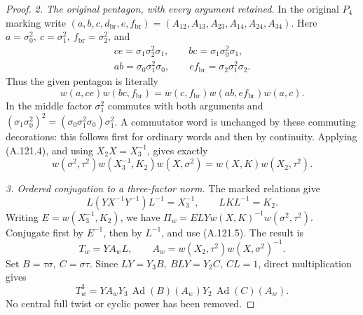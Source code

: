 \begin{proof}
\emph{2. The original pentagon, with every argument retained.}
In the original \(P_4\) marking write
\((a,b,c,d_{\mathrm{br}},e,f_{\mathrm{br}})
=(A_{12},A_{13},A_{23},A_{14},A_{24},A_{34})\).
Here \(a=\sigma_0^2,\ c=\sigma_1^2,\ f_{\mathrm{br}}=\sigma_2^2\),
and
\[
 \begin{gathered}
 ce=\sigma_1\sigma_2^2\sigma_1,\qquad
 bc=\sigma_1\sigma_0^2\sigma_1,\\
 ab=\sigma_0\sigma_1^2\sigma_0,\qquad
 ef_{\mathrm{br}}=\sigma_2\sigma_1^2\sigma_2 .
 \end{gathered}
\]
Thus the given pentagon is literally
\[
 w(a,ce)w(bc,f_{\mathrm{br}})
 =w(c,f_{\mathrm{br}})w(ab,ef_{\mathrm{br}})w(a,c).
\]
In the middle factor \(\sigma_1^2\) commutes with both arguments and
\((\sigma_1\sigma_0^2)^2
 =(\sigma_0\sigma_1^2\sigma_0)\sigma_1^2\).
A commutator word is unchanged by these commuting decorations:
this follows first for ordinary words and then by continuity.
Applying (A.121.4), and using \(X_2X=X_3^{-1}\), gives exactly
\[
 w(\sigma^2,\tau^2)w(X_3^{-1},K_2)w(X,\sigma^2)
       =w(X,K)w(X_2,\tau^2).                                  \tag{A.121.5}
\]

\emph{3. Ordered conjugation to a three-factor norm.}
The marked relations give
\[
 L(YX^{-1}Y^{-1})L^{-1}=X_3^{-1},\qquad LKL^{-1}=K_2 .
\]
Writing \(E=w(X_3^{-1},K_2)\), we have
\(\Pi_w=E L Yw(X,K)^{-1}w(\sigma^2,\tau^2)\).
Conjugate first by \(E^{-1}\), then by \(L^{-1}\), and use
(A.121.5). The result is
\[
 T_w=Y A_wL,\qquad
 A_w=w(X_2,\tau^2)w(X,\sigma^2)^{-1}.                          \tag{A.121.6}
\]
Set \(B=\tau\sigma,\ C=\sigma\tau\). Since
\(LY=Y_3B,\ BLY=Y_2C,\ CL=1\), direct multiplication gives
\[
 T_w^3=Y A_wY_3\,\operatorname{Ad}(B)(A_w)
                       Y_2\,\operatorname{Ad}(C)(A_w).        \tag{A.121.7}
\]
No central full twist or cyclic power has been removed.


\end{proof}
